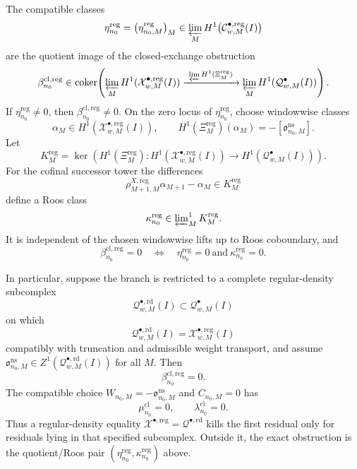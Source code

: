 \begin{prop}
  The compatible classes
  \[
    \eta^{\mathrm{reg}}_{n_0}
      =
    \bigl(\eta^{\mathrm{reg}}_{n_0,M}\bigr)_M
      \in
    \varprojlim_M
    H^1\bigl(\mathcal C^{\bullet,\mathrm{reg}}_{w,M}(I)\bigr)
  \]
  are the quotient image of the closed-exchange obstruction
  \[
    \beta^{\mathrm{cl},\mathrm{reg}}_{n_0}
      \in
      \operatorname{coker}\!\left(
        \varprojlim_M H^1(\mathcal X^{\bullet,\mathrm{reg}}_{w,M}(I))
        \xrightarrow{\ \varprojlim H^1(\Xi^{\mathrm{reg}}_M)\ }
        \varprojlim_M H^1(\mathcal Q^\bullet_{w,M}(I))
      \right).
  \]
  If \(\eta^{\mathrm{reg}}_{n_0}\neq0\), then
  \(\beta^{\mathrm{cl},\mathrm{reg}}_{n_0}\neq0\).  On the zero locus of
  \(\eta^{\mathrm{reg}}_{n_0}\), choose windowwise classes
  \[
    \alpha_M\in
    H^1(\mathcal X^{\bullet,\mathrm{reg}}_{w,M}(I)),
    \qquad
    H^1(\Xi^{\mathrm{reg}}_M)(\alpha_M)
      =
    -[\mathfrak o^{\mathrm{ns}}_{n_0,M}].
  \]
  Let
  \[
    K^{\mathrm{reg}}_M
      =
    \ker\!\left(
      H^1(\Xi^{\mathrm{reg}}_M)\colon
      H^1(\mathcal X^{\bullet,\mathrm{reg}}_{w,M}(I))
      \to
      H^1(\mathcal Q^\bullet_{w,M}(I))
    \right).
  \]
  For the cofinal successor tower the differences
  \[
    \rho^{X,\mathrm{reg}}_{M+1,M}\alpha_{M+1}-\alpha_M
      \in K^{\mathrm{reg}}_M
  \]
  define a Roos class
  \[
    \kappa^{\mathrm{reg}}_{n_0}
      \in
    \varprojlim\nolimits^1_M K^{\mathrm{reg}}_M.
  \]
  It is independent of the chosen windowwise lifts up to Roos
  coboundary, and
  \[
    \beta^{\mathrm{cl},\mathrm{reg}}_{n_0}=0
      \quad\Longleftrightarrow\quad
    \eta^{\mathrm{reg}}_{n_0}=0
      \ \text{and}\
    \kappa^{\mathrm{reg}}_{n_0}=0.
  \]

  In particular, suppose the branch is restricted to a complete
  regular-density subcomplex
  \[
    \mathcal Q^{\bullet,\mathrm{rd}}_{w,M}(I)
      \subset
    \mathcal Q^\bullet_{w,M}(I)
  \]
  on which
  \[
    \mathcal Q^{\bullet,\mathrm{rd}}_{w,M}(I)
      =
    \mathcal X^{\bullet,\mathrm{reg}}_{w,M}(I)
  \]
  compatibly with truncation and admissible weight transport, and assume
  \(\mathfrak o^{\mathrm{ns}}_{n_0,M}\in
  Z^1(\mathcal Q^{\bullet,\mathrm{rd}}_{w,M}(I))\) for all \(M\).  Then
  \[
    \beta^{\mathrm{cl},\mathrm{reg}}_{n_0}=0.
  \]
  The compatible choice
  \(W_{n_0,M}=-\mathfrak o^{\mathrm{ns}}_{n_0,M}\) and \(C_{n_0,M}=0\)
  has
  \[
    \mu^{\mathrm{cl}}_{n_0}=0,\qquad
    \lambda^{\mathrm{cl}}_{n_0}=0.
  \]
  Thus a regular-density equality
  \(\mathcal X^{\bullet,\mathrm{reg}}=\mathcal Q^{\bullet,\mathrm{rd}}\)
  kills the first residual only for residuals lying in that specified
  subcomplex.  Outside it, the exact obstruction is the quotient/Roos pair
  \((\eta^{\mathrm{reg}}_{n_0},\kappa^{\mathrm{reg}}_{n_0})\) above.
\end{prop}

